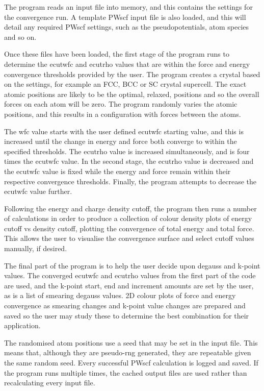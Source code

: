 The program reads an input file into memory, and this contains the settings for the convergence run.  A template PWscf input file is also loaded, and this will detail any required PWscf settings, such as the pseudopotentials, atom species and so on.  

Once these files have been loaded, the first stage of the program runs to determine the ecutwfc and ecutrho values that are within the force and energy convergence thresholds provided by the user.  The program creates a crystal based on the settings, for example an FCC, BCC or SC crystal supercell.  The exact atomic positions are likely to be the optimal, relaxed, positions and so the overall forces on each atom will be zero.  The program randomly varies the atomic positions, and this results in a configuration with forces between the atoms.

The wfc value starts with the user defined ecutwfc starting value, and this is increased until the change in energy and force both converge to within the specified thresholds.  The ecutrho value is increased simultaneously, and is four times the ecutwfc value.  In the second stage, the ecutrho value is decreased and the ecutwfc value is fixed while the energy and force remain within their respective convergence thresholds.  Finally, the program attempts to decrease the ecutwfc value further.

Following the energy and charge density cutoff, the program then runs a number of calculations in order to produce a collection of colour density plots of energy cutoff vs density cutoff, plotting the convergence of total energy and total force.  This allows the user to visualise the convergence surface and select cutoff values manually, if desired.

The final part of the program is to help the user decide upon degauss and k-point values.  The converged ecutwfc and ecutrho values from the first part of the code are used, and the k-point start, end and increment amounts are set by the user, as is a list of smearing degauss values.  2D colour plots of force and energy convergence as smearing changes and k-point value changes are prepared and saved so the user may study these to determine the best combination for their application.

The randomised atom positions use a seed that may be set in the input file.  This means that, although they are pseudo-rng generated, they are repeatable given the same random seed.  Every successful PWscf calculation is logged and saved.  If the program runs multiple times, the cached output files are used rather than recalculating every input file.

